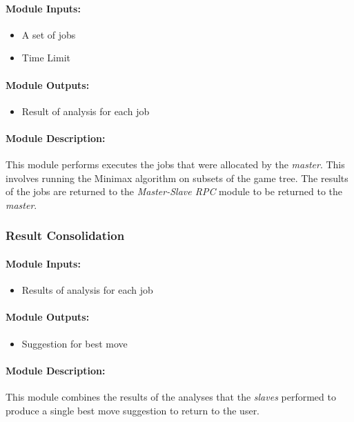 \documentclass[pdftex,12pt,a4paper]{article}
\begin{document}
\paragraph{Module Inputs:}
\begin{itemize}
\item A set of jobs
\item Time Limit
\end{itemize}

\paragraph{Module Outputs:}
\begin{itemize}
\item Result of analysis for each job
\end{itemize}

\paragraph{Module Description:\\}
This module performs executes the jobs that were allocated by the \emph{master}. This involves running the Minimax algorithm on subsets of the game tree. The results of the jobs are returned to the \emph{Master-Slave RPC} module to be returned to the \emph{master}.


\subsubsection{Result Consolidation}

\paragraph{Module Inputs:}
\begin{itemize}
\item Results of analysis for each job
\end{itemize}

\paragraph{Module Outputs:}
\begin{itemize}
\item Suggestion for best move
\end{itemize}

\paragraph{Module Description:\\}
This module combines the results of the analyses that the \emph{slaves} performed to produce a single best move suggestion to return to the user.
\end{document}
